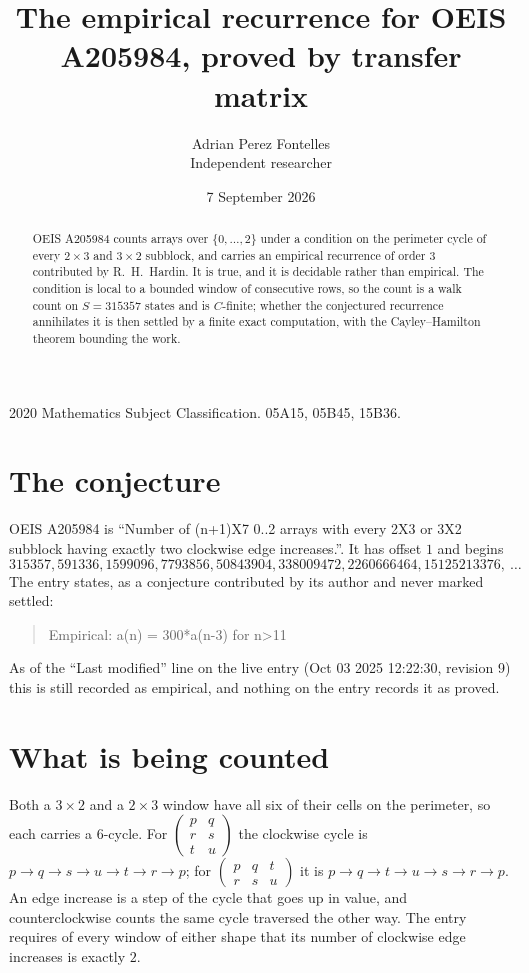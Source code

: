 \documentclass[11pt,a4paper]{article}
\title{The empirical recurrence for OEIS A205984, proved by transfer matrix}
\author{Adrian Perez Fontelles\\ \small Independent researcher}
\date{7 September 2026}
\theoremstyle{plain}
\theoremstyle{definition}
\begin{document}
\maketitle

\begin{abstract}
OEIS A205984 counts arrays over $\{0,\dots,2\}$ under a condition on the perimeter cycle of
every $2\times3$ and $3\times2$ subblock, and carries an empirical recurrence of order $3$ contributed by
R.~H.~Hardin. It is true, and it is decidable rather than empirical. The condition is local to
a bounded window of consecutive rows, so the count is a walk count on $S=315357$ states and is
$C$-finite; whether the conjectured recurrence annihilates it is then settled by a finite exact
computation, with the Cayley--Hamilton theorem bounding the work.
\end{abstract}

\noindent\small 2020 Mathematics Subject Classification. 05A15, 05B45, 15B36.\normalsize

\section{The conjecture}

OEIS A205984 is ``Number of (n+1)X7 0..2 arrays with every 2X3 or 3X2 subblock having exactly two clockwise edge increases.''. It has offset $1$ and begins
\[
315357, 591336, 1599096, 7793856, 50843904, 338009472, 2260666464, 15125213376,\ \dots
\]
The entry states, as a conjecture contributed by its author and never marked settled:
\begin{quote}
Empirical: a(n) = 300*a(n-3) for n>11
\end{quote}
As of the ``Last modified'' line on the live entry (Oct 03 2025 12:22:30, revision 9) this is still
recorded as empirical, and nothing on the entry records it as proved.

\section{What is being counted}

Both a $3\times2$ and a $2\times3$ window have all six of their cells on the
perimeter, so each carries a $6$-cycle. For
$\begin{pmatrix}p&q\\r&s\\t&u\end{pmatrix}$ the clockwise cycle is
$p\to q\to s\to u\to t\to r\to p$; for
$\begin{pmatrix}p&q&t\\r&s&u\end{pmatrix}$ it is
$p\to q\to t\to u\to s\to r\to p$. An edge increase is a step of the cycle that goes up in
value, and counterclockwise counts the same cycle traversed the other way. The entry requires
of every window of either shape that its number of clockwise edge increases is exactly $2$.
\end{document}
